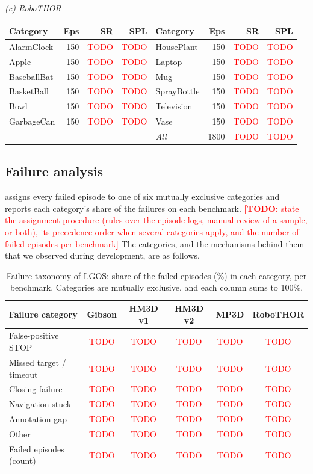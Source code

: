 \documentclass[10pt]{article}
\newcommand{\TODO}[1]{\textcolor{red}{\textbf{[TODO:} #1\textbf{]}}}
\newcommand{\tbd}{\textcolor{red}{TODO}}
\newcommand{\ours}{LGOS\xspace}
\newcommand{\SR}{\textsc{SR}\xspace}
\newcommand{\SPL}{\textsc{SPL}\xspace}
\begin{document}
\begin{table}[tp]
\medskip
\textit{(c) RoboTHOR}\\[2pt]
\begin{tabular}{l rrr l rrr}
\toprule
Category & Eps & \SR & \SPL & Category & Eps & \SR & \SPL \\
\midrule
AlarmClock & 150 & \tbd & \tbd & HousePlant & 150 & \tbd & \tbd \\
Apple & 150 & \tbd & \tbd & Laptop & 150 & \tbd & \tbd \\
BaseballBat & 150 & \tbd & \tbd & Mug & 150 & \tbd & \tbd \\
BasketBall & 150 & \tbd & \tbd & SprayBottle & 150 & \tbd & \tbd \\
Bowl & 150 & \tbd & \tbd & Television & 150 & \tbd & \tbd \\
GarbageCan & 150 & \tbd & \tbd & Vase & 150 & \tbd & \tbd \\
\midrule
\multicolumn{4}{l}{} & \textit{All} & 1800 & \tbd & \tbd \\
\bottomrule
\end{tabular}
\end{table}

\subsection{Failure analysis}\label{app:additional-failures}

 assigns every failed episode to one of six mutually exclusive categories and reports each category's share of the failures on each benchmark. \TODO{state the assignment procedure (rules over the episode logs, manual review of a sample, or both), its precedence order when several categories apply, and the number of failed episodes per benchmark} The categories, and the mechanisms behind them that we observed during development, are as follows.

\begin{table}[tp]
\centering
\small
\caption{Failure taxonomy of \ours: share of the failed episodes (\%) in each category, per benchmark. Categories are mutually exclusive, and each column sums to 100\%.}
\label{tab:failures}
\begin{tabular}{l ccccc}
\toprule
Failure category & Gibson & HM3D v1 & HM3D v2 & MP3D & RoboTHOR \\
\midrule
False-positive STOP & \tbd & \tbd & \tbd & \tbd & \tbd \\
Missed target / timeout & \tbd & \tbd & \tbd & \tbd & \tbd \\
Closing failure & \tbd & \tbd & \tbd & \tbd & \tbd \\
Navigation stuck & \tbd & \tbd & \tbd & \tbd & \tbd \\
Annotation gap & \tbd & \tbd & \tbd & \tbd & \tbd \\
Other & \tbd & \tbd & \tbd & \tbd & \tbd \\
\midrule
Failed episodes (count) & \tbd & \tbd & \tbd & \tbd & \tbd \\
\bottomrule
\end{tabular}
\end{table}
\end{document}
